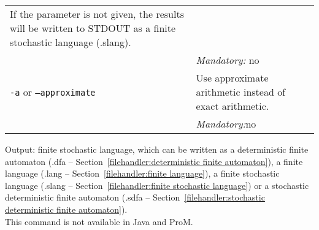 {\begin{tabularx}{\linewidth}{lX}
If the parameter is not given, the results will be written to STDOUT as a finite stochastic language (.slang).\\
&\textit{Mandatory:} \quad no\\
\texttt{-a} or \texttt{--approximate} & Use approximate arithmetic instead of exact arithmetic.\\
&\textit{Mandatory:}\quad no\\
\bottomrule
\end{tabularx}
\noindent Output: finite stochastic language, which can be written as a deterministic finite automaton (.dfa -- Section~\ref{filehandler:deterministic finite automaton}), a finite language (.lang -- Section~\ref{filehandler:finite language}), a finite stochastic language (.slang -- Section~\ref{filehandler:finite stochastic language}) or a stochastic deterministic finite automaton (.sdfa -- Section~\ref{filehandler:stochastic deterministic finite automaton}).
\\This command is not available in Java and ProM.
}

